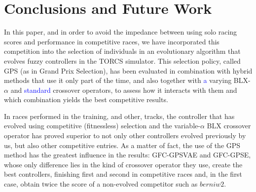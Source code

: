 \documentclass[10pt,journal,compsoc]{IEEEtran}
\begin{document}
\section{Conclusions and Future Work} 
\label{sec:conclusions}

In this paper, and in order to avoid the impedance between using solo
racing scores and performance in competitive races, we have
incorporated this competition into the selection of individuals in an
evolutionary algorithm that evolves fuzzy controllers in the TORCS
simulator. This selection policy, called GPS (as in Grand Prix
Selection), has been evaluated in combination with hybrid methods that
use it only part of the time, and also together with \textcolor{blue}{a} varying
BLX-$\alpha$ and \textcolor{blue}{ standard} crossover operators, to assess how it
interacts with them and which combination yields the best competitive
results.


In races performed in the training, and other, tracks, the controller
that has evolved using competitive (fitnessless) selection and the
variable-$\alpha$ BLX crossover operator has proved superior to not
only other controllers evolved previously by us, but also other
competitive entries. As a matter of fact, the use of the GPS method has the greatest
influence in the results: {\sf GFC-GPSVAE} and {\sf GFC-GPSE}, whose only
difference lies in the kind of crossover operator they use, create the
best controllers, finishing first and second in competitive races and,
in the first case, obtain twice the score of a non-evolved
competitor such as $berniw2$.
\end{document}
